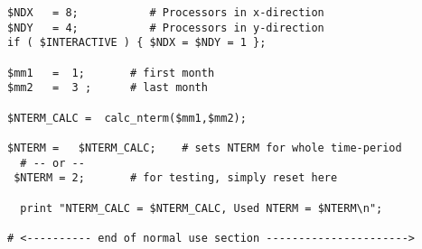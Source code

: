 \begin{verbatim}
$NDX   = 8;           # Processors in x-direction
$NDY   = 4;           # Processors in y-direction
if ( $INTERACTIVE ) { $NDX = $NDY = 1 };

$mm1   =  1;       # first month
$mm2   =  3 ;      # last month

$NTERM_CALC =  calc_nterm($mm1,$mm2);

$NTERM =   $NTERM_CALC;    # sets NTERM for whole time-period
  # -- or --
 $NTERM = 2;       # for testing, simply reset here

  print "NTERM_CALC = $NTERM_CALC, Used NTERM = $NTERM\n";

# <---------- end of normal use section ---------------------->
\end{verbatim}

